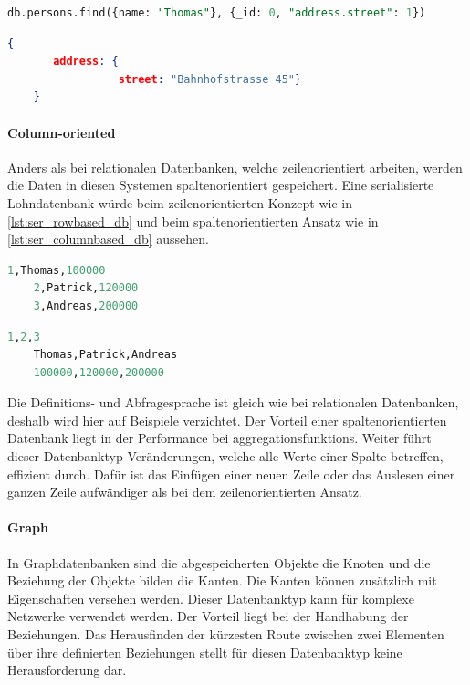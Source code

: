 \begin{lstlisting}[language=SQL, caption=Abfrage in MongoDB, label=lst:select_mongodb]  
    db.persons.find({name: "Thomas"}, {_id: 0, "address.street": 1})
\end{lstlisting}

\begin{lstlisting}[language=JSON, caption=Resultat der Abfrage in MongoDB, label=lst:select_result_mongodb]  
    {
       address: {
                 street: "Bahnhofstrasse 45"}
    }
\end{lstlisting}

\paragraph{Column-oriented}
Anders als bei relationalen Datenbanken, welche zeilenorientiert arbeiten, werden die Daten in diesen Systemen spaltenorientiert gespeichert. Eine serialisierte Lohndatenbank würde beim 
zeilenorientierten Konzept wie in \autoref{lst:ser_rowbased_db} und beim spaltenorientierten Ansatz wie in \autoref{lst:ser_columnbased_db} aussehen.

\begin{lstlisting}[language=SQL, caption=Serialisierung zeilenorientierte Datenbank, label=lst:ser_rowbased_db]  
    1,Thomas,100000
    2,Patrick,120000
    3,Andreas,200000
\end{lstlisting}

\newpage

\begin{lstlisting}[language=SQL, caption=Serialisierung spaltenorientierte Datenbank, label=lst:ser_columnbased_db]  
    1,2,3
    Thomas,Patrick,Andreas
    100000,120000,200000
\end{lstlisting}

Die Definitions- und Abfragesprache ist gleich wie bei relationalen Datenbanken, deshalb wird hier auf Beispiele verzichtet. Der Vorteil 
einer spaltenorientierten Datenbank liegt in der Performance bei \glspl{aggregationsfunktion}. Weiter führt dieser Datenbanktyp Veränderungen, 
welche alle Werte einer Spalte betreffen, effizient durch. Dafür ist das Einfügen einer neuen Zeile oder das Auslesen einer ganzen Zeile aufwändiger als bei dem zeilenorientierten Ansatz.

\paragraph{Graph}
In Graphdatenbanken sind die abgespeicherten Objekte die Knoten und die Beziehung der Objekte bilden die Kanten. Die Kanten können zusätzlich mit Eigenschaften versehen werden. Dieser 
Datenbanktyp kann für komplexe Netzwerke verwendet werden. Der Vorteil liegt bei der Handhabung der Beziehungen. Das Herausfinden der kürzesten Route zwischen zwei Elementen über 
ihre definierten Beziehungen stellt für diesen Datenbanktyp keine Herausforderung dar.

